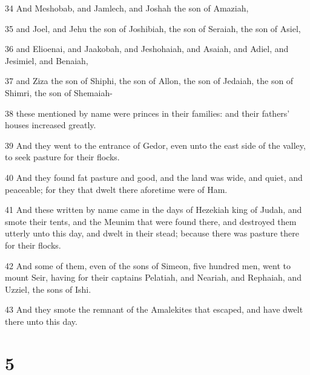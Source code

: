 \par 34 And Meshobab, and Jamlech, and Joshah the son of Amaziah,
\par 35 and Joel, and Jehu the son of Joshibiah, the son of Seraiah, the son of Asiel,
\par 36 and Elioenai, and Jaakobah, and Jeshohaiah, and Asaiah, and Adiel, and Jesimiel, and Benaiah,
\par 37 and Ziza the son of Shiphi, the son of Allon, the son of Jedaiah, the son of Shimri, the son of Shemaiah-
\par 38 these mentioned by name were princes in their families: and their fathers' houses increased greatly.
\par 39 And they went to the entrance of Gedor, even unto the east side of the valley, to seek pasture for their flocks.
\par 40 And they found fat pasture and good, and the land was wide, and quiet, and peaceable; for they that dwelt there aforetime were of Ham.
\par 41 And these written by name came in the days of Hezekiah king of Judah, and smote their tents, and the Meunim that were found there, and destroyed them utterly unto this day, and dwelt in their stead; because there was pasture there for their flocks.
\par 42 And some of them, even of the sons of Simeon, five hundred men, went to mount Seir, having for their captains Pelatiah, and Neariah, and Rephaiah, and Uzziel, the sons of Ishi.
\par 43 And they smote the remnant of the Amalekites that escaped, and have dwelt there unto this day.

\chapter{5}

